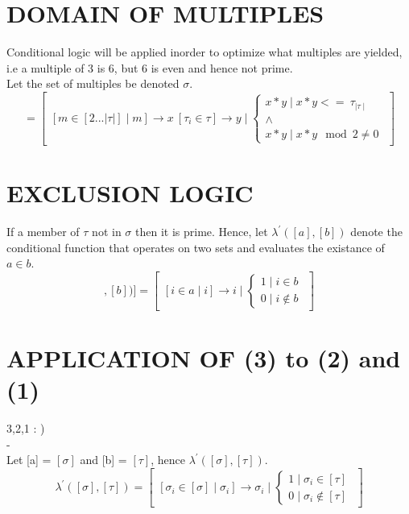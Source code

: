 \documentclass[11pt]{article}
\begin{document}
\section{DOMAIN OF MULTIPLES}
Conditional logic will be applied inorder to optimize what multiples are yielded, i.e a multiple of 3 is 6, but 6 is even and hence not
prime.\\
Let the set of multiples be denoted $\sigma$.
\begin{equation}[\sigma]=\begin{bmatrix}[m\in[2...|\tau|]\mid m]\rightarrow x\ [\tau_i\in\tau]\rightarrow y\mid\begin{cases}x*y\mid x*y <= \ 
\tau_{\mid\tau\mid}\\ \land\\x*y\mid x*y \mod 2 \not = 0\end{cases}\end{bmatrix}\end{equation}
\section{EXCLUSION LOGIC}
If a member of $\tau$ not in $\sigma$ then it is prime.
Hence, let $\lambda^\prime([a],[b])$ denote the conditional function that operates on two sets and evaluates the existance of $a\in b$.
\begin{equation}[\lambda^\prime([a],[b])] =\begin{bmatrix} [i \in a\mid i]\rightarrow i \mid\begin{cases}1 \mid i \in b\\ 0 \mid i 
\not\in b\end{cases}\end{bmatrix}\end{equation}

\section{APPLICATION OF (3) to (2) and (1)}
{\color{red}3,2,1 : )}\\
{\color{white}-}
\\
Let [a] = $[\sigma]$ and [b] = $[\tau]$, hence $\lambda^\prime([\sigma],[\tau])$.
\begin{equation} \lambda^\prime([\sigma],[\tau])= \begin{bmatrix}[\sigma_i\in[\sigma]\mid\sigma_i]\rightarrow\sigma_i\mid
	\begin{cases}1 \mid \sigma_i \in [\tau]\\ 0 \mid \sigma_i \not\in [\tau]\end{cases}\end{bmatrix} \end{equation}
\end{document}
